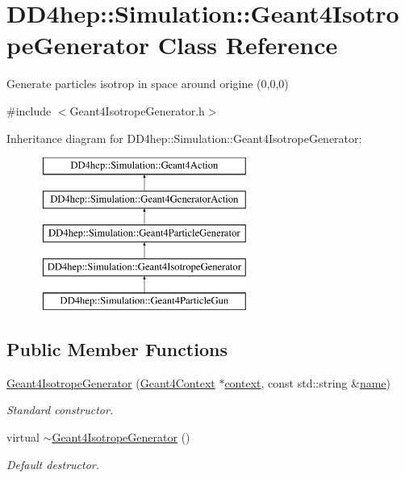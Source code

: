 \hypertarget{class_d_d4hep_1_1_simulation_1_1_geant4_isotrope_generator}{}\section{D\+D4hep\+:\+:Simulation\+:\+:Geant4\+Isotrope\+Generator Class Reference}
\label{class_d_d4hep_1_1_simulation_1_1_geant4_isotrope_generator}


Generate particles isotrop in space around origine (0,0,0)  




{\ttfamily \#include $<$Geant4\+Isotrope\+Generator.\+h$>$}

Inheritance diagram for D\+D4hep\+:\+:Simulation\+:\+:Geant4\+Isotrope\+Generator\+:\begin{figure}[H]
\begin{center}
\leavevmode
\includegraphics[height=5.000000cm]{class_d_d4hep_1_1_simulation_1_1_geant4_isotrope_generator}
\end{center}
\end{figure}
\subsection*{Public Member Functions}
\begin{DoxyCompactItemize}
\item 
\hyperlink{class_d_d4hep_1_1_simulation_1_1_geant4_isotrope_generator_ac90529dd8592e8377045d50037483a6e}{Geant4\+Isotrope\+Generator} (\hyperlink{class_d_d4hep_1_1_simulation_1_1_geant4_context}{Geant4\+Context} $\ast$\hyperlink{class_d_d4hep_1_1_simulation_1_1_geant4_action_aa9d87f0ec2a72b7fc2591b18f98d75cf}{context}, const std\+::string \&\hyperlink{class_d_d4hep_1_1_simulation_1_1_geant4_action_af374e70b014d16afb81dd9d77cc3894b}{name})
\begin{DoxyCompactList}\small\item\em Standard constructor. \end{DoxyCompactList}\item 
virtual \hyperlink{class_d_d4hep_1_1_simulation_1_1_geant4_isotrope_generator_a0c8cc2163617f319fd3b58a11b3e64ea}{$\sim$\+Geant4\+Isotrope\+Generator} ()
\begin{DoxyCompactList}\small\item\em Default destructor. \end{DoxyCompactList}\end{DoxyCompactItemize}
